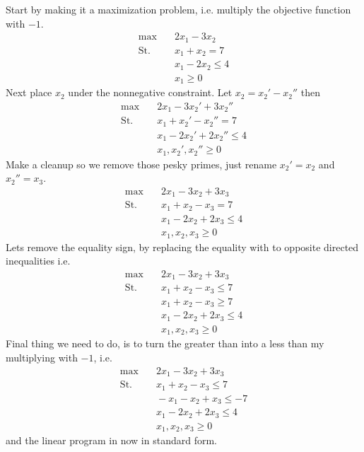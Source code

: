 \documentclass[10pt]{article}
\begin{document}
Start by making it a maximization problem, i.e. multiply the objective function with $-1$.
\begin{align*}
 \max &\quad 2x_1 - 3x_2  \\ 
 \text{St.} &\quad  x_1 + x_2  = 7 \\
            &\quad  x_1 - 2x_2 \leq 4 \\
            &\quad  x_1        \geq 0  
\end{align*}
Next place $x_2$ under the nonnegative constraint. Let $x_2 = x_2'-x_2''$ then
\begin{align*}
 \max &\quad 2x_1 - 3x_2' +3x_2''  \\ 
 \text{St.} &\quad  x_1 + x_2'-x_2''  = 7 \\
            &\quad  x_1 - 2x_2' +2x_2'' \leq 4 \\
            &\quad  x_1, x_2', x_2''    \geq 0  
\end{align*}
Make a cleanup so we remove those pesky primes, just rename $x_2' = x_2$ and $x_2'' = x_3$.
\begin{align*}
 \max &\quad 2x_1 - 3x_2 +3x_3  \\ 
 \text{St.} &\quad  x_1 + x_2-x_3  = 7 \\
            &\quad  x_1 - 2x_2 +2x_3 \leq 4 \\
            &\quad  x_1, x_2, x_3    \geq 0  
\end{align*}
Lets remove the equality sign, by replacing the equality with to opposite directed inequalities i.e.
\begin{align*}
 \max &\quad 2x_1 - 3x_2 +3x_3  \\ 
 \text{St.} &\quad  x_1 + x_2-x_3  \leq 7 \\
            &\quad  x_1 + x_2-x_3  \geq 7 \\
            &\quad  x_1 - 2x_2 +2x_3 \leq 4 \\
            &\quad  x_1, x_2, x_3    \geq 0  
\end{align*}
Final thing we need to do, is to turn the greater than into a less than my multiplying with $-1$, i.e.
\begin{align*}
 \max &\quad 2x_1 - 3x_2 +3x_3  \\ 
 \text{St.} &\quad  x_1 + x_2-x_3  \leq 7 \\
            &\quad  -x_1 - x_2 + x_3  \leq -7 \\
            &\quad  x_1 - 2x_2 +2x_3 \leq 4 \\
            &\quad  x_1, x_2, x_3    \geq 0  
\end{align*}
and the linear program in now in standard form.
\end{document}
